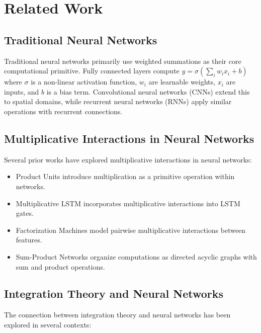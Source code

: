 \documentclass{article}
\begin{document}
\section{Related Work}

\subsection{Traditional Neural Networks}

Traditional neural networks primarily use weighted summations as their core computational primitive. Fully connected layers compute $y = \sigma(\sum_i w_i x_i + b)$ where $\sigma$ is a non-linear activation function, $w_i$ are learnable weights, $x_i$ are inputs, and $b$ is a bias term. Convolutional neural networks (CNNs) \cite{lecun1998gradient} extend this to spatial domains, while recurrent neural networks (RNNs) \cite{hochreiter1997long} apply similar operations with recurrent connections.

\subsection{Multiplicative Interactions in Neural Networks}

Several prior works have explored multiplicative interactions in neural networks:

\begin{itemize}
    \item Product Units \cite{durbin1989product} introduce multiplication as a primitive operation within networks.
    
    \item Multiplicative LSTM \cite{krause2016multiplicative} incorporates multiplicative interactions into LSTM gates.
    
    \item Factorization Machines \cite{rendle2010factorization} model pairwise multiplicative interactions between features.
    
    \item Sum-Product Networks \cite{poon2011sum} organize computations as directed acyclic graphs with sum and product operations.
\end{itemize}

\subsection{Integration Theory and Neural Networks}

The connection between integration theory and neural networks has been explored in several contexts:
\end{document}
